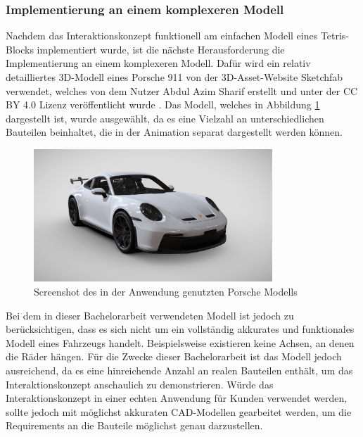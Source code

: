 \subsubsection{Implementierung an einem komplexeren Modell}

Nachdem das Interaktionskonzept funktionell am einfachen Modell eines Tetris-Blocks implementiert wurde, ist die nächste Herausforderung die Implementierung an einem komplexeren Modell.
Dafür wird ein relativ detailliertes 3D-Modell eines Porsche 911 von der 3D-Asset-Website Sketchfab verwendet, welches von dem Nutzer Abdul Azim Sharif erstellt und unter der CC BY 4.0 Lizenz veröffentlicht wurde \autocite[][]{SketchfabPorsche}.
\newpage
Das Modell, welches in Abbildung \ref{fig:porsche} dargestellt ist, wurde ausgewählt, da es eine Vielzahl an unterschiedlichen Bauteilen beinhaltet, die in der Animation separat dargestellt werden können.

\begin{figure}[H]
    \centering
    \includegraphics[width=0.8\textwidth]{images/PorscheModell.png}
    \caption{Screenshot des in der Anwendung genutzten Porsche Modells}
    \label{fig:porsche}
\end{figure}

Bei dem in dieser Bachelorarbeit verwendeten Modell ist jedoch zu berücksichtigen, dass es sich nicht um ein vollständig akkurates und funktionales Modell eines Fahrzeugs handelt.
Beispielsweise existieren keine Achsen, an denen die Räder hängen.
Für die Zwecke dieser Bachelorarbeit ist das Modell jedoch ausreichend, da es eine hinreichende Anzahl an \glqq{}realen\grqq{} Bauteilen enthält, um das Interaktionskonzept anschaulich zu demonstrieren.
Würde das Interaktionskonzept in einer echten Anwendung für Kunden verwendet werden, sollte jedoch mit möglichst akkuraten CAD-Modellen gearbeitet werden, um die Requirements an die Bauteile möglichst genau darzustellen.


